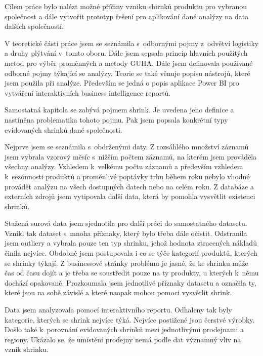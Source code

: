 Cílem práce bylo nalézt možné příčiny vzniku shirnků produktu pro vybranou společnost a dále vytvořit prototyp řešení pro aplikování dané analýzy na data dalších společností.

V teoretické části práce jsem se seznámila s~odbornými pojmy z~odvětví logistiky a druhy plýtvání v~tomto oboru. Dále jsem sepsala princip hlavních použitých metod pro výběr proměnných a metody GUHA. Dále jsem definovala používané odborné pojmy týkající se analýzy. Teorie se také věnuje popisu nástrojů, které jsem použila při analýze. Především se jedná o popis aplikace Power BI pro vytváření interaktivních business intelligence reportů.

Samostatná kapitola se zabývá pojmem shrink. Je uvedena jeho definice a nastíněna problematika tohoto pojmu. Pak jsem popsala konkrétní typy evidovaných shrinků dané společnosti.

Nejprve jsem se seznámila s~obdrženými daty. Z rozsáhlého množství záznamů jsem vybrala vzorový měsíc s~nižším počtem záznamů, na kterém jsem prováděla všechny analýzy. Vzhledem k~velkému počtu záznamů a především vzhledem k~sezónnosti produktů a proměnlivé poptávky trhu během roku nebylo vhodné provádět analýzu na všech dostupných datech nebo na celém roku. Z databáze a externích zdrojů jsem vytipovala další data, která by pomohla vysvětlit existenci shrinků.

Stažená surová data jsem sjednotila pro další práci do samostatného datasetu. Vznikl tak dataset s~mnoha příznaky, který bylo třeba dále očistit. Odstranila jsem outliery a vybrala pouze ten typ shrinku, jehož hodnota ztracených nákladů činila nejvíce. Obdobně jsem postupovala i co se týče kategorií produktů, kterých se shrinky týkají. Z businessové stránky problému je jasné, že ke shrinku může čas od času dojít a je třeba se soustředit pouze na ty produkty, u kterých k~němu dochází opakovaně. 
Prozkoumala jsem jednotlivé příznaky datasetu a označila ty, které jsou na sobě závislé a které naopak mohou pomoci vysvětlit shrink. 

Data jsem analyzovala pomocí interaktivního reportu. Odhaleny tak byly kategorie, kterých se shrink nejvíce týká. Nejvíce postižené jsou čerstvé výrobky. Došlo také k~porovnání evidovaných shrinků mezi jednotlivými prodejnami a regiony. Ukázalo se, že umístění prodejny nemá podle dat významný vliv na vznik shrinku. 


